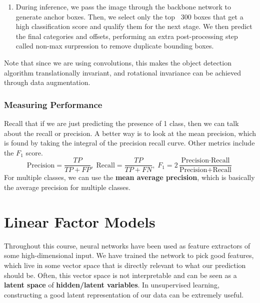 \documentclass{article}
\theoremstyle{definition}
\theoremstyle{remark}
\theoremstyle{definition}
\begin{document}
\begin{enumerate}
          \item During inference, we pass the image through the backbone network to generate anchor boxes. Then, we select only the top ~300 boxes that get a high classification score and qualify them for the next stage. We then predict the final categories and offsets, performing an extra post-processing step called non-max surpression to remove duplicate bounding boxes. 
      \end{enumerate}

      Note that since we are using convolutions, this makes the object detection algorithm translationally invariant, and rotational invariance can be achieved through data augmentation. 

    \subsubsection{Measuring Performance} 

      Recall that if we are just predicting the presence of 1 class, then we can talk about the recall or precision. A better way is to look at the mean precision, which is found by taking the integral of the precision recall curve. Other metrics include the $F_1$ score. 
      \[\text{Precision} = \frac{TP}{TP + FP}, \; \text{Recall} = \frac{TP}{TP + FN}, \; F_1 = 2 \frac{\text{Precision} \cdot \text{Recall}}{\text{Precision} + \text{Recall}}\]
      For multiple classes, we can use the \textbf{mean average precision}, which is basically the average precision for multiple classes.

    \section{Linear Factor Models}

        Throughout this course, neural networks have been used as feature extractors of some high-dimensional input. We have trained the network to pick good features, which live in some vector space that is directly relevant to what our prediction should be. Often, this vector space is not interpretable and can be seen as a \textbf{latent space} of \textbf{hidden/latent variables}. In unsupervised learning, constructing a good latent representation of our data can be extremely useful. 
\end{document}

